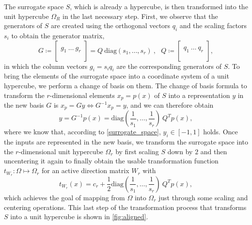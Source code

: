 \documentclass[
  a4paper,  %
  twoside,  %
  bibliography=totoc,
  headsepline,
  cleardoublepage=empty,
  parskip=half,
  draft=false
]{scrbook}
\begin{document}
The surrogate space $S$, which is already a hypercube, is then transformed into the unit hypercube $\Omega_R$ in the last necessary step.
First, we observe that the generators of $S$ are created using the orthogonal vectors $q_i$ and the scaling factors $s_i$ to obtain the generator matrix,
\begin{equation}
G \coloneqq \begin{bmatrix}
  \\
    g_1 ~ \dots  ~ g_r\\
    \\
  \end{bmatrix}=Q ~ \text{diag}(s_1, \dots, s_r) ~, ~~~
Q \coloneqq \begin{bmatrix}
  \\
    q_1 ~ \dots  ~ q_r\\
    \\
  \end{bmatrix},
\end{equation}
in which the column vectors $g_i=s_i q_i$ are the corresponding generators of $S$.
To bring the elements of the surrogate space into a coordinate system of a unit hypercube, we perform a change of basis on them.
The change of basis formula to transform the $r$-dimensional elements $x_p=p(x)$ of $S$ into a representation $y$ in the new basis $G$ is $x_p=Gy \Leftrightarrow G^{-1} x_p=y$, and we can therefore obtain
\begin{equation}
y=G^{-1} p(x)=\text{diag}\left(\frac{1}{s_1}, \dots, \frac{1}{s_r}\right) ~Q^T p(x),
\label{alignment}
\end{equation}
where we know that, according to \cref{surrogate_space}, $y_i \in [-1,1]$ holds.
Once the inputs are represented in the new basis, we transform the surrogate space into the $r$-dimensional unit hypercube $\Omega_r$ by first scaling $S$ down by $2$ and then uncentering it again to finally obtain the usable transformation function $t_{W_r} \colon \Omega \mapsto \Omega_r$ for an active direction matrix $W_r$ with
\begin{equation}
t_{W_r}(x) = c_r + \frac{1}{2} \text{diag}\left(\frac{1}{s_1}, \dots, \frac{1}{s_r}\right) ~Q^T p(x),
\label{linear_trans}
\end{equation}
which achieves the goal of mapping from $\Omega$ into $\Omega_r$ just through some scaling and centering operations.
This last step of the transformation process that transforms $S$ into a unit hypercube is shown in \cref{fig:aligned}.
\end{document}
